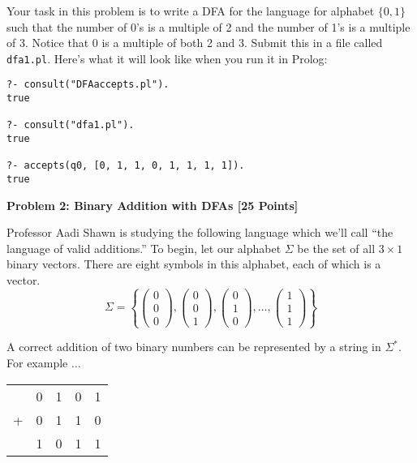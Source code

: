 \documentclass[12pt]{article}
\newcommand{\Problem}[3]{\mbox{} \newline \noindent \textbf{\textbf{Problem #1: #2 [#3 Points] \\ }}}
\begin{document}
Your task in this problem is to write a DFA for the language for alphabet $\{0, 1\}$ such that the number of 0's is a multiple of 2 and the number of 1's is a multiple of 3.  Notice that 0 is a multiple of both 2 and 3.  Submit this in a file called \verb+dfa1.pl+.  Here's what it will look like when you run it in Prolog:

\begin{verbatim}
?- consult("DFAaccepts.pl").
true

?- consult("dfa1.pl").
true

?- accepts(q0, [0, 1, 1, 0, 1, 1, 1, 1]).
true

\end{verbatim}

\Problem{2}{Binary Addition with DFAs}{25}

Professor Aadi Shawn is studying the following language which we'll call ``the language of valid additions.''
To begin, let our alphabet $\Sigma$ be the set of all $3 \times 1$
binary vectors.  There are eight symbols in this alphabet, each of which is a vector.
\[
\Sigma = \left\{ \left( \begin{array}{c} 0 \\ 0 \\ 0 \end{array} \right),
	    \left( \begin{array}{c} 0 \\ 0 \\ 1 \end{array} \right),
	    \left( \begin{array}{c} 0 \\ 1 \\ 0 \end{array} \right),
	    \ldots , 
 	    \left( \begin{array}{c} 1 \\ 1 \\ 1 \end{array} \right) \right\} 
\]

A correct addition of two binary numbers can be represented by a string
in $\Sigma^{*}$.  For example $\dots$

\begin{center}
\begin{tabular}{lllll}
 & 0 & 1 & 0 & 1\\
+& 0 & 1 & 1 & 0 \\ \hline 
 & 1 & 0 & 1 & 1 
\end{tabular}
\end{center}
\end{document}
